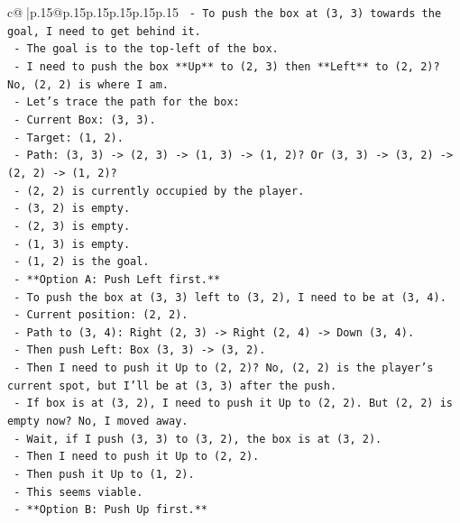 \documentclass{article}
\begin{document}
{\begin{supertabular}{c@{$\;$}|p{.15\linewidth}@{}p{.15\linewidth}p{.15\linewidth}p{.15\linewidth}p{.15\linewidth}p{.15\linewidth}}
{{{\texttt{    {-} To push the box at (3, 3) towards the goal, I need to get behind it.} \\
\texttt{    {-} The goal is to the top{-}left of the box.} \\
\texttt{    {-} I need to push the box **Up** to (2, 3) then **Left** to (2, 2)? No, (2, 2) is where I am.} \\
\texttt{    {-} Let's trace the path for the box:} \\
\texttt{        {-} Current Box: (3, 3).} \\
\texttt{        {-} Target: (1, 2).} \\
\texttt{        {-} Path: (3, 3) {-}> (2, 3) {-}> (1, 3) {-}> (1, 2)? Or (3, 3) {-}> (3, 2) {-}> (2, 2) {-}> (1, 2)?} \\
\texttt{        {-} (2, 2) is currently occupied by the player.} \\
\texttt{        {-} (3, 2) is empty.} \\
\texttt{        {-} (2, 3) is empty.} \\
\texttt{        {-} (1, 3) is empty.} \\
\texttt{        {-} (1, 2) is the goal.} \\
\texttt{    {-} **Option A: Push Left first.**} \\
\texttt{        {-} To push the box at (3, 3) left to (3, 2), I need to be at (3, 4).} \\
\texttt{        {-} Current position: (2, 2).} \\
\texttt{        {-} Path to (3, 4): Right (2, 3) {-}> Right (2, 4) {-}> Down (3, 4).} \\
\texttt{        {-} Then push Left: Box (3, 3) {-}> (3, 2).} \\
\texttt{        {-} Then I need to push it Up to (2, 2)? No, (2, 2) is the player's current spot, but I'll be at (3, 3) after the push.} \\
\texttt{        {-} If box is at (3, 2), I need to push it Up to (2, 2). But (2, 2) is empty now? No, I moved away.} \\
\texttt{        {-} Wait, if I push (3, 3) to (3, 2), the box is at (3, 2).} \\
\texttt{        {-} Then I need to push it Up to (2, 2).} \\
\texttt{        {-} Then push it Up to (1, 2).} \\
\texttt{        {-} This seems viable.} \\
\texttt{    {-} **Option B: Push Up first.**} \\
}}}
\end{supertabular}}
\end{document}
